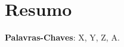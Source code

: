 \chapter[Resumo]{Resumo}
\label{chap:resumo}
	
	
	\begin{flushleft}
		\textbf{Palavras-Chaves}: X, Y, Z, A.
	\end{flushleft}